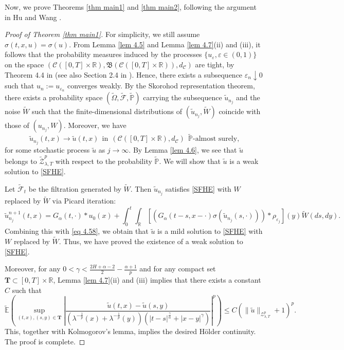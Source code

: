 \documentclass[11pt,reqno]{amsart}
\numberwithin{equation}{section}
\newcommand{\1}{{\bf 1}}
\newcommand{\2}{{\bf 2}}
\begin{document}
Now, we prove  Theorems \ref{thm main1} and  \ref{thm main2}, following the argument in Hu and Wang \cite[Section 4]{HW2022}.
\begin{proof}[Proof of Theorem \ref{thm main1}]
For simplicity, we still assume $\sigma(t,x,u)=\sigma(u)$.  From Lemma \ref{lem 4.5} and Lemma \ref{lem 4.7}(ii) and (iii),  it follows that the  probability measures induced by the processes $\{u_{\varepsilon},\varepsilon\in(0,1)\}$ on the space $\left(\mathcal{C}([0,T]\times\mathbb{R}), \mathfrak{B}(\mathcal{C}([0,T]\times\mathbb{R})), d_{\mathcal{C}}\right)$ are tight, by Theorem 4.4 in \cite{HW2022} (see also Section 2.4 in \cite{KS1991}). Hence,  there exists  a subsequence $\varepsilon_n\downarrow0$ such that $u_n:=u_{\varepsilon_n}$ converges weakly. By the Skorohod representation theorem,  there exists a probability space $(\widetilde{\Omega},\widetilde{\mathcal{F}}, \widetilde{\mathbb{P}})$ carrying the subsequence $\widetilde{u}_{n_j}$ and the noise $\widetilde{W}$ such that the finite-dimensional distributions of $(\widetilde{u}_{n_j},\widetilde{W})$ coincide with those of $(u_{n_j},W)$. Moreover, we have
\begin{equation}\label{eq 4.58}
\widetilde{u}_{n_j}(t,x)\to \widetilde{u}(t,x) \ \ \mbox{in}\ \ \left(\mathcal{C}([0,T]\times\mathbb{R}),d_{\mathcal{C}}\right)\  \  \widetilde{\mathbb{P}}\text{-almost surely,}
\end{equation}
for some  stochastic process $\widetilde{u}$ as $j\to\infty$. By Lemma \ref{lem 4.6},  we see that $\widetilde{u}$ belongs to $\widetilde{\mathcal{Z}}_{\lambda,T}^p$ with respect to the probability $\widetilde{\mathbb{P}}$. We will show that $\widetilde{u}$ is a weak solution to \eqref{SFHE}.

Let $\widetilde{\mathcal{F}}_t$  be the filtration generated by $\widetilde{W}$. Then $\widetilde{u}_{n_j}$ satisfies \eqref{SFHE} with $W$ replaced by $\widetilde{W}$ via Picard iteration:
  \begin{equation*}
      \widetilde{u}_{n_j}^{n+1}(t,x)=G_{\alpha}(t,\cdot)*u_0(x)+\int_0^t\int_{\mathbb{R}}[(G_{\alpha}(t-s,x-\cdot)\sigma(\widetilde{u}_{n_j}(s,\cdot)))*\rho_{\varepsilon_j}](y)\widetilde{W}(ds,dy).
   \end{equation*}
 Combining this with   \eqref{eq 4.58}, we obtain that  $\widetilde{u}$ is a mild solution to \eqref{SFHE} with $W$ replaced by $\widetilde{W}$.  Thus, we have proved the existence of a weak solution to \eqref{SFHE}.


   Moreover, for any $0<\gamma<\frac{2H+\alpha-2}{2}-\frac{\alpha+1}{p}$ and for any compact set $\textbf{T}\subset [0,T]\times \mathbb{R}$, Lemma \ref{lem 4.7}(ii) and (iii) implies that there exists  a constant $C$ such that
   $$
   \widetilde{\mathbb{E}}\left(\sup_{(t,x),(s,y)\in \textbf{T}}\left|\frac{\widetilde{u}(t,x)-\widetilde{u}(s,y)}{\left(\lambda^{-\frac1{p}}(x)+\lambda^{-\frac1{p}}(y)\right)\left(|t-s|^{\frac{\gamma}{\alpha}}+|x-y|^{\gamma}\right)}\right|^p\right)\le C\left(\|\widetilde{u}\|_{\mathcal{Z}_{\lambda,T}^p}+1\right)^p.
   $$
 This, together  with Kolmogorov's lemma,  implies the desired H\"older continuity.
  The proof is complete. 
\end{proof}
\end{document}
